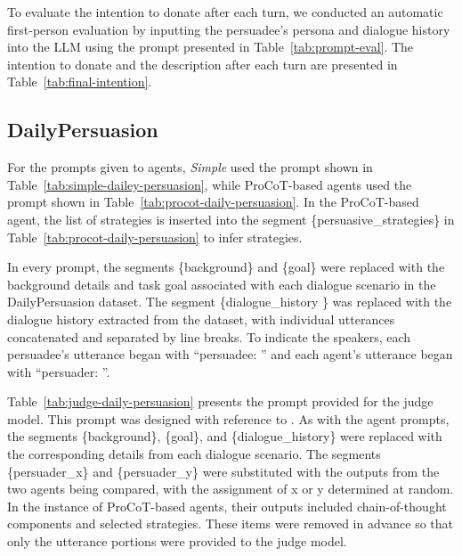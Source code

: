 \documentclass[11pt]{article}
\begin{document}
To evaluate the intention to donate after each turn, we conducted an automatic first-person evaluation by inputting the persuadee's persona and dialogue history into the LLM using the prompt presented in Table~\ref{tab:prompt-eval}.
The intention to donate and the description after each turn are presented in Table~\ref{tab:final-intention}.

\subsection{DailyPersuasion}
For the prompts given to agents, \textit{Simple} used the prompt shown in Table~\ref{tab:simple-dailey-persuasion}, while ProCoT-based agents used the prompt shown in Table~\ref{tab:procot-daily-persuasion}. 
In the ProCoT-based agent, the list of strategies is inserted into the segment \{persuasive\_strategies\} in Table~\ref{tab:procot-daily-persuasion} to infer strategies.

In every prompt, the segments \{background\} and \{goal\} were replaced with the background details and task goal associated with each dialogue scenario in the DailyPersuasion dataset. 
The segment \{dialogue\_history \} was replaced with the dialogue history extracted from the dataset, with individual utterances concatenated and separated by line breaks. 
To indicate the speakers, each persuadee's utterance began with ``persuadee: '' and each agent's utterance began with ``persuader: ''.

Table~\ref{tab:judge-daily-persuasion} presents the prompt provided for the judge model.
This prompt was designed with reference to \citet{jin-etal-2024-persuading}.
As with the agent prompts, the segments \{background\}, \{goal\}, and \{dialogue\_history\} were replaced with the corresponding details from each dialogue scenario. 
The segments \{persuader\_x\} and \{persuader\_y\} were substituted with the outputs from the two agents being compared, with the assignment of x or y determined at random. 
In the instance of ProCoT-based agents, their outputs included chain-of-thought components and selected strategies. 
These items were removed in advance so that only the utterance portions were provided to the judge model.
\end{document}
